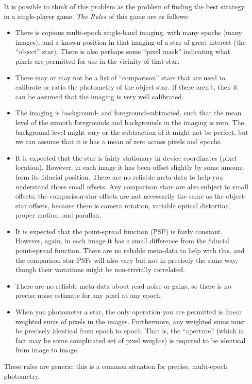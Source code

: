 \documentclass[12pt, letterpaper, preprint]{aastex}
\begin{document}
It is possible to think of this problem as the problem of finding the best strategy in a single-player game.
\emph{The Rules} of this game are as follows:
\begin{itemize}
\item
  There is copious multi-epoch single-band imaging,
  with many epochs (many images),
  and a known position in that imaging of a star of great interest (the ``object'' star).
  There is also perhaps some ``pixel mask'' indicating what pixels are permitted for use
  in the vicinity of that star.
\item
  There may or may not be a list of ``comparison'' stars
  that are used to calibrate or ratio the photometry of the object star.
  If there aren't, then it can be assumed that the imaging is very well calibrated.
\item
  The imaging is background- and foreground-subtracted,
  such that the mean level of the smooth foregrounds and backgrounds in the imaging is zero.
  The background level might vary or the subtraction of it might not be perfect,
  but we can assume that it is has a mean of zero across pixels and epochs.
\item
  It is expected that the star is fairly stationary in device coordinates (pixel location).
  However, in each image it has been offset slightly by some amount from its fiducial position.
  There are no reliable meta-data to help you understand those small offsets.
  Any comparison stars are also subject to small offsets;
  the comparison-star offsets are not necessarily the same as the object-star offsets,
  because there is camera rotation, variable optical distortion, proper motion, and parallax.
\item
  It is expected that the point-spread function (PSF) is fairly constant.
  However, again, in each image it has a small difference from the fiducial point-spread function.
  There are no reliable meta-data to help with this,
  and the comparison star PSFs will also vary but not in precisely the same way,
  though their variations might be non-trivially correlated.
\item
  There are no reliable meta-data about read noise or gains,
  so there is no precise noise estimate for any pixel at any epoch.
\item
  When you photometer a star,
  the only operation you are permitted is linear weighted sums of pixels in the images.
  Furthermore, any weighted sums must be precisely identical from epoch to epoch.
  That is, the ``aperture''
  (which in fact may be some complicated set of pixel weights)
  is required to be identical from image to image.
\end{itemize}
These rules are generic;
  this is a common situation for precise, multi-epoch photometry.
\end{document}

